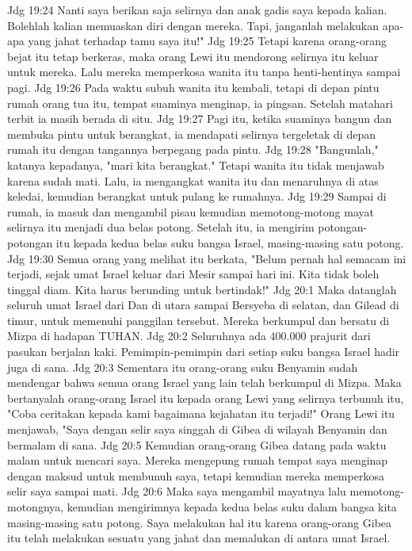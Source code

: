 Jdg 19:24  Nanti saya berikan saja selirnya dan anak gadis saya kepada kalian. Bolehlah kalian memuaskan diri dengan mereka. Tapi, janganlah melakukan apa-apa yang jahat terhadap tamu saya itu!"
Jdg 19:25  Tetapi karena orang-orang bejat itu tetap berkeras, maka orang Lewi itu mendorong selirnya itu keluar untuk mereka. Lalu mereka memperkosa wanita itu tanpa henti-hentinya sampai pagi.
Jdg 19:26  Pada waktu subuh wanita itu kembali, tetapi di depan pintu rumah orang tua itu, tempat suaminya menginap, ia pingsan. Setelah matahari terbit ia masih berada di situ.
Jdg 19:27  Pagi itu, ketika suaminya bangun dan membuka pintu untuk berangkat, ia mendapati selirnya tergeletak di depan rumah itu dengan tangannya berpegang pada pintu.
Jdg 19:28  "Bangunlah," katanya kepadanya, "mari kita berangkat." Tetapi wanita itu tidak menjawab karena sudah mati. Lalu, ia mengangkat wanita itu dan menaruhnya di atas keledai, kemudian berangkat untuk pulang ke rumahnya.
Jdg 19:29  Sampai di rumah, ia masuk dan mengambil pisau kemudian memotong-motong mayat selirnya itu menjadi dua belas potong. Setelah itu, ia mengirim potongan-potongan itu kepada kedua belas suku bangsa Israel, masing-masing satu potong.
Jdg 19:30  Semua orang yang melihat itu berkata, "Belum pernah hal semacam ini terjadi, sejak umat Israel keluar dari Mesir sampai hari ini. Kita tidak boleh tinggal diam. Kita harus berunding untuk bertindak!"
Jdg 20:1  Maka datanglah seluruh umat Israel dari Dan di utara sampai Bersyeba di selatan, dan Gilead di timur, untuk memenuhi panggilan tersebut. Mereka berkumpul dan bersatu di Mizpa di hadapan TUHAN.
Jdg 20:2  Seluruhnya ada 400.000 prajurit dari pasukan berjalan kaki. Pemimpin-pemimpin dari setiap suku bangsa Israel hadir juga di sana.
Jdg 20:3  Sementara itu orang-orang suku Benyamin sudah mendengar bahwa semua orang Israel yang lain telah berkumpul di Mizpa. Maka bertanyalah orang-orang Israel itu kepada orang Lewi yang selirnya terbunuh itu, "Coba ceritakan kepada kami bagaimana kejahatan itu terjadi!" Orang Lewi itu menjawab, "Saya dengan selir saya singgah di Gibea di wilayah Benyamin dan bermalam di sana.
Jdg 20:5  Kemudian orang-orang Gibea datang pada waktu malam untuk mencari saya. Mereka mengepung rumah tempat saya menginap dengan maksud untuk membunuh saya, tetapi kemudian mereka memperkosa selir saya sampai mati.
Jdg 20:6  Maka saya mengambil mayatnya lalu memotong-motongnya, kemudian mengirimnya kepada kedua belas suku dalam bangsa kita masing-masing satu potong. Saya melakukan hal itu karena orang-orang Gibea itu telah melakukan sesuatu yang jahat dan memalukan di antara umat Israel.
